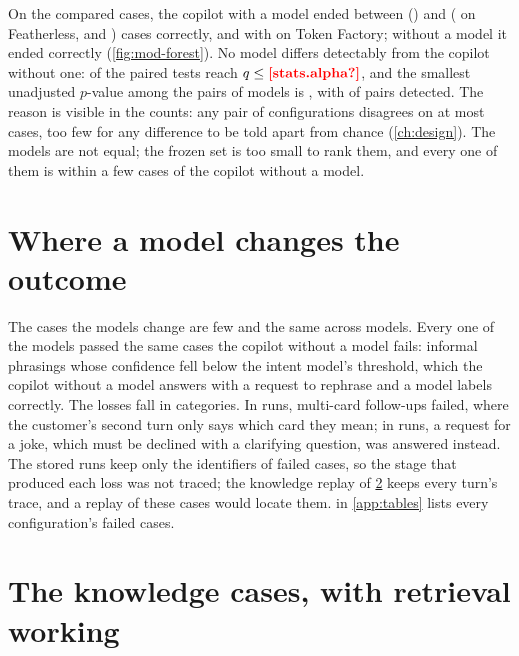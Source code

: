 On the  compared cases, the copilot with a model ended between
 () and 
( on Featherless, and ) cases correctly, and
 with  on Token Factory; without a model it ended
 correctly (\cref{fig:mod-forest}). No model differs detectably from the copilot
without one:  of the  paired tests reach $q \le \proto{stats.alpha}$,
and the smallest unadjusted $p$-value among the pairs of models is , with
 of  pairs detected. The reason is visible in the counts: any pair of
configurations disagrees on at most  cases, too few for any difference to be told apart
from chance (\cref{ch:design}). The models are not equal; the frozen set is too small to rank them, and every one of
them is within a few cases of the copilot without a model.

\section{Where a model changes the outcome}

The cases the models change are few and the same across models. Every one of the  models passed
the same  cases the copilot without a model fails: informal phrasings whose confidence
fell below the intent model's threshold, which the copilot without a model answers with a request to rephrase and a
model labels correctly. The losses fall in  categories. In
 runs, multi-card follow-ups failed, where the customer's second turn only says
which card they mean; in  runs, a request for a joke, which must be declined
with a clarifying question, was answered instead. The stored runs keep only the identifiers of failed cases, so the
stage that produced each loss was not traced; the knowledge replay of \cref{sec:knowledge-replay} keeps every turn's
trace, and a replay of these cases would locate them.  in \cref{app:tables} lists every
configuration's failed cases.

\section{The knowledge cases, with retrieval working}\label{sec:knowledge-replay}


